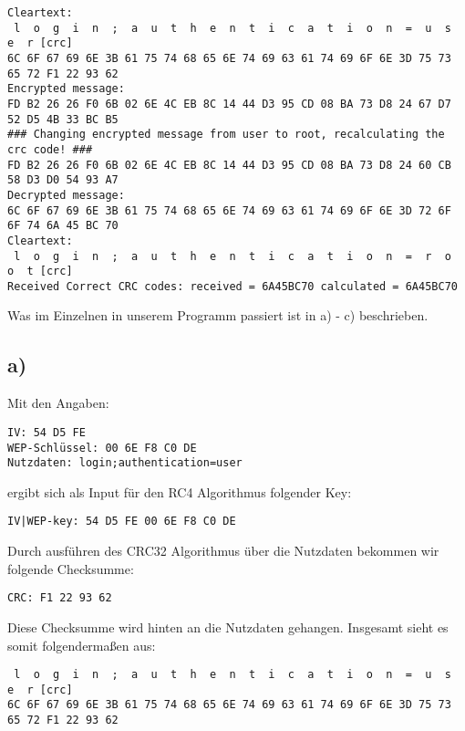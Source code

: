 \documentclass[10pt,a4paper]{article}
\begin{document}
\begin{small}
\begin{verbatim}
Cleartext:
 l  o  g  i  n  ;  a  u  t  h  e  n  t  i  c  a  t  i  o  n  =  u  s  e  r [crc]
6C 6F 67 69 6E 3B 61 75 74 68 65 6E 74 69 63 61 74 69 6F 6E 3D 75 73 65 72 F1 22 93 62 
Encrypted message:
FD B2 26 26 F0 6B 02 6E 4C EB 8C 14 44 D3 95 CD 08 BA 73 D8 24 67 D7 52 D5 4B 33 BC B5 
### Changing encrypted message from user to root, recalculating the crc code! ###
FD B2 26 26 F0 6B 02 6E 4C EB 8C 14 44 D3 95 CD 08 BA 73 D8 24 60 CB 58 D3 D0 54 93 A7 
Decrypted message:
6C 6F 67 69 6E 3B 61 75 74 68 65 6E 74 69 63 61 74 69 6F 6E 3D 72 6F 6F 74 6A 45 BC 70 
Cleartext:
 l  o  g  i  n  ;  a  u  t  h  e  n  t  i  c  a  t  i  o  n  =  r  o  o  t [crc]
Received Correct CRC codes: received = 6A45BC70 calculated = 6A45BC70
\end{verbatim}
\end{small}

Was im Einzelnen in unserem Programm passiert ist in a) - c) beschrieben.

\subsection*{a)}

Mit den Angaben:

\begin{verbatim}
IV: 54 D5 FE
WEP-Schlüssel: 00 6E F8 C0 DE
Nutzdaten: login;authentication=user
\end{verbatim}

ergibt sich als Input für den RC4 Algorithmus folgender Key:

\begin{verbatim}
IV|WEP-key: 54 D5 FE 00 6E F8 C0 DE
\end{verbatim}

Durch ausführen des CRC32 Algorithmus über die Nutzdaten bekommen wir folgende Checksumme:

\begin{verbatim}
CRC: F1 22 93 62
\end{verbatim}

Diese Checksumme wird hinten an die Nutzdaten gehangen. Insgesamt sieht es somit folgendermaßen aus:

\begin{verbatim}
 l  o  g  i  n  ;  a  u  t  h  e  n  t  i  c  a  t  i  o  n  =  u  s  e  r [crc]
6C 6F 67 69 6E 3B 61 75 74 68 65 6E 74 69 63 61 74 69 6F 6E 3D 75 73 65 72 F1 22 93 62 
\end{verbatim}
\end{document}
